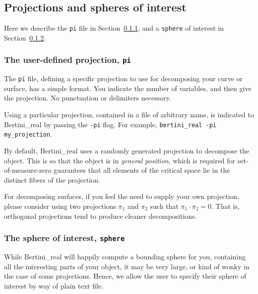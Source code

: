 \subsection{Projections and spheres of interest}


 Here we describe the {\tt pi} file in Section~\ref{sec:pi}, and a {\tt sphere} of interest in Section~\ref{sec:sphere}.

\subsubsection{The user-defined projection, \texttt{pi}}
\label{sec:pi}

The {\tt pi} file, defining a specific projection to use for decomposing your curve or surface, has a simple format.  You indicate the number of variables, and then give the projection.  No punctuation or delimiters necessary.  

Using a particular projection, contained in a file of arbitrary name, is indicated to Bertini\_real by passing the {\tt -pi} flag.  For example, {\tt bertini\_real -pi my\_projection}.

By default, Bertini\_real uses a randomly generated projection to decompose the object.  This is so that the object is in {\em general position}, which is required for set-of-measure-zero guarantees that all elements of the critical space lie in the distinct fibers of the projection.


For decomposing surfaces, if you feel the need to supply your own projection, please consider using two projections $\pi_1$ and $\pi_2$ such that $\pi_1 \cdot \pi_2 = 0$.  That is, orthogonal projections tend to produce cleaner decompositions.


\subsubsection{The sphere of interest, \texttt{sphere}}
\label{sec:sphere}

While Bertini\_real will happily compute a bounding sphere for you, containing all the interesting parts of your object, it may be very large, or kind of wonky in the case of some projections.  Hence, we allow the user to specify their sphere of interest by way of plain text file.

